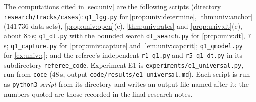 The computations cited in \cref{sec:univ} are the following scripts (directory \texttt{research/\allowbreak tracks/\allowbreak cases}): \texttt{q1\_lgg.py} for \cref{prop:univ:determine}, \cref{thm:univ:anchor} ($141\,736$ data sets), \cref{prop:univ:open}(c), \cref{thm:univ:rates} and \cref{prop:univ:dt}(c), about $85$\,s; \texttt{q1\_dt.py} with the bounded search \texttt{dt\_search.py} for \cref{prop:univ:dt}, $7$\,s; \texttt{q1\_capture.py} for \cref{prop:univ:capture} and \cref{lem:univ:capcrit}; \texttt{q1\_qmodel.py} for \cref{ex:univ:q}; and the referee's independent \texttt{r1\_q1.py} and \texttt{r5\_q1\_dt.py} in its subdirectory \texttt{referee\_code}. Experiment E1 is \texttt{experiments/\allowbreak e1\_universal.py}, run from \texttt{code} ($48$\,s, output \texttt{code/\allowbreak results/\allowbreak e1\_universal.md}). Each script is run as \texttt{python3} \textit{script} from its directory and writes an output file named after it; the numbers quoted are those recorded in the final research notes.
